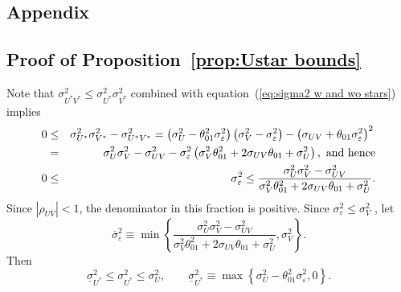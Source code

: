 \documentclass[12pt]{article}
\begin{document}
 \begin{appendices}%
 

\section{Appendix\label{sec:Appx}}

\medskip

\subsection{Proof of Proposition~\protect\ref{prop:Ustar bounds}}

Note that $\sigma _{U^{\ast }V^{\ast }}^{2}\leq \sigma _{U^{\ast
}}^{2}\sigma _{V^{\ast }}^{2}$ combined with equation~(\ref{eq:sigma2 w and
wo stars}) implies%
\begin{eqnarray}
0 &\leq &\sigma _{U^{\ast }}^{2}\sigma _{V^{\ast }}^{2}-\sigma _{U^{\ast
}V^{\ast }}^{2}=\left( \sigma _{U}^{2}-\theta _{01}^{2}\sigma _{\varepsilon
}^{2}\right) \left( \sigma _{V}^{2}-\sigma _{\varepsilon }^{2}\right)
-\left( \sigma _{UV}+\theta _{01}\sigma _{\varepsilon }^{2}\right) ^{2}%
{} 
\notag \\
&=&\sigma _{U}^{2}\sigma _{V}^{2}-\sigma _{UV}^{2}-\sigma _{\varepsilon
}^{2}\left( \sigma _{V}^{2}\theta _{01}^{2}+2\sigma _{UV}\theta _{01}+\sigma
_{U}^{2}\right) ,\text{ and hence}  \notag \\
0 &\leq &\sigma _{\varepsilon }^{2}\leq \frac{\sigma _{U}^{2}\sigma
_{V}^{2}-\sigma _{UV}^{2}}{\sigma _{V}^{2}\theta _{01}^{2}+2\sigma
_{UV}\theta _{01}+\sigma _{U}^{2}}.  \label{eq:sigma2 eps CS}
\end{eqnarray}%
Since $\left\vert \rho _{UV}\right\vert <1$, the denominator in this
fraction is positive. Since $\sigma _{\varepsilon }^{2}\leq \sigma _{V}^{2}$%
, let%
\begin{equation*}
\overline{\sigma }_{\varepsilon }^{2}\equiv \min \left\{ \frac{\sigma
_{U}^{2}\sigma _{V}^{2}-\sigma _{UV}^{2}}{\sigma _{V}^{2}\theta
_{01}^{2}+2\sigma _{UV}\theta _{01}+\sigma _{U}^{2}},\sigma _{V}^{2}\right\}
.
\end{equation*}%
Then%
\begin{equation}
\underline{\sigma }_{U^{\ast }}^{2}\leq \sigma _{U^{\ast }}^{2}\leq \sigma
_{U}^{2},\qquad \underline{\sigma }_{U^{\ast }}^{2}\equiv \max \left\{
\sigma _{U}^{2}-\theta _{01}^{2}\overline{\sigma }_{\varepsilon
}^{2},0\right\} .  \label{eq:bound s2Us}
\end{equation}%

\end{appendices}
\end{document}
